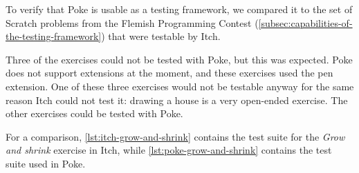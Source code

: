 \documentclass[../main]{subfiles}
\begin{document}
To verify that Poke is usable as a testing framework, we compared it to the set of Scratch problems from the Flemish Programming Contest (\cref{subsec:capabilities-of-the-testing-framework}) that were testable by Itch.

Three of the exercises could not be tested with Poke, but this was expected.
Poke does not support extensions at the moment, and these exercises used the pen extension.
One of these three exercises would not be testable anyway for the same reason Itch could not test it: drawing a house is a very open-ended exercise.
The other exercises could be tested with Poke.

For a comparison, \cref{lst:itch-grow-and-shrink} contains the test suite for the \emph{Grow and shrink} exercise in Itch, while \cref{lst:poke-grow-and-shrink} contains the test suite used in Poke.
\end{document}
